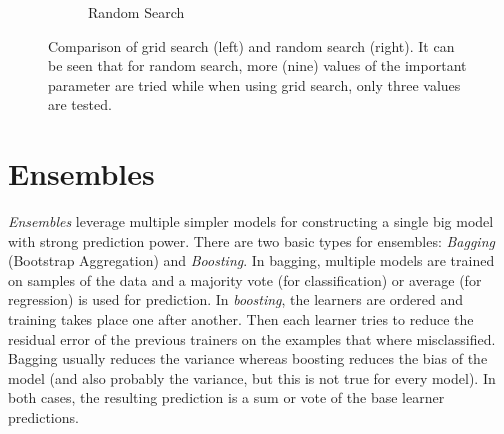 \begin{figure}
\begin{subfigure}{0.49\linewidth}
						\caption{Random Search}
					\end{subfigure}
					\caption{Comparison of grid search (left) and random search (right). It can be seen that for random search, more (nine) values of the important parameter are tried while when using grid search, only three values are tested.}
					\label{fig:gridRandomSearch}
				\end{figure}

	\section{Ensembles}
		\emph{Ensembles} leverage multiple simpler models for constructing a single big model with strong prediction power. There are two basic types for ensembles: \emph{Bagging} (Bootstrap Aggregation) and \emph{Boosting}. In bagging, multiple models are trained on samples of the data and a majority vote (for classification) or average (for regression) is used for prediction. In \emph{boosting}, the learners are ordered and training takes place one after another. Then each learner tries to reduce the residual error of the previous trainers on the examples that where misclassified. Bagging usually reduces the variance whereas boosting reduces the bias of the model (and also probably the variance, but this is not true for every model). In both cases, the resulting prediction is a sum or vote of the base learner predictions.

